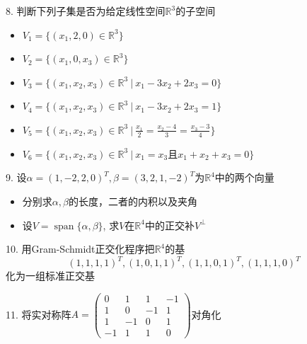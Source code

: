 
\begin{frame}

8. 判断下列子集是否为给定线性空间$\mathbb{R}^3$的子空间\\
\begin{itemize}
\item[(1)] $V_1 = \{(x_1,2,0) \in \mathbb{R}^3\}$
\vspace{0.4em}
\item[(2)] $V_2 = \{(x_1,0,x_3) \in \mathbb{R}^3\}$
\vspace{0.4em}
\item[(3)] $V_3 = \{(x_1,x_2,x_3) \in \mathbb{R}^3 \ |\ x_1-3x_2+2x_3=0\}$
\vspace{0.4em}
\item[(4)] $V_4 = \{(x_1,x_2,x_3) \in \mathbb{R}^3 \ |\ x_1-3x_2+2x_3=1\}$
\vspace{0.4em}
\item[(5)] $V_5 = \{(x_1,x_2,x_3) \in \mathbb{R}^3 \ |\ \frac{x_1}{2}=\frac{x_2-4}{3}=\frac{x_3-3}{4}\}$
\vspace{0.4em}
\item[(6)] $V_6 = \{(x_1,x_2,x_3) \in \mathbb{R}^3 \ |\ x_1=x_3\mbox{且}x_1+x_2+x_3=0\}$
\end{itemize}

\end{frame}


\begin{frame}

9. 设$\alpha = (1,-2,2,0)^T, \beta = (3,2,1,-2)^T$为$\mathbb{R}^4$中的两个向量
\begin{itemize}
\item[(1)] 分别求$\alpha, \beta$的长度，二者的内积以及夹角
\vspace{0.4em}
\item[(2)] 设$V = \operatorname{span}\{\alpha, \beta\}$, 求$V$在$\mathbb{R}^4$中的正交补$V^{\perp}$
\end{itemize}

\vspace{1em}

10. 用Gram-Schmidt正交化程序把$\mathbb{R}^4$的基
\[(1,1,1,1)^T,(1,0,1,1)^T,(1,1,0,1)^T,(1,1,1,0)^T\]
化为一组标准正交基

\vspace{1em}

11. 将实对称阵$A = \begin{pmatrix} 0 & 1 & 1 & -1 \\ 1 & 0 & -1 & 1 \\ 1 & -1 & 0 & 1 \\ - 1 & 1 & 1 & 0 \end{pmatrix}$对角化

\end{frame}

